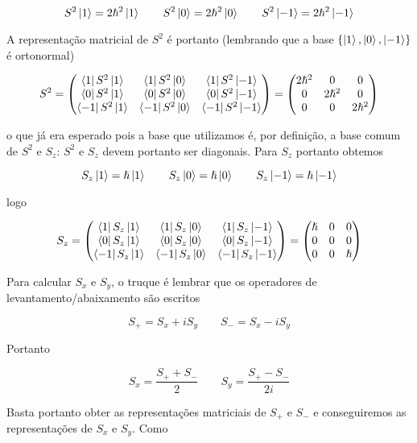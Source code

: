 \documentclass[a4paper, 12pt, notitlepage]{article}
\begin{document}
\begin{enumerate}
\[
S^2 \ket{1} = 2 \hslash^2 \ket{1} \qquad S^2 \ket{0} = 2\hslash^2 \ket{0} \qquad S^2 \ket{-1} = 2\hslash^2 \ket{-1}
\]

A representação matricial de $S^2$ é portanto (lembrando que a base $\{\ket{1}, \ket{0}, \ket{-1}\}$ é ortonormal)

\[
S^2 = \begin{pmatrix} 
  \bra{1} S^2 \ket{1} & \bra{1} S^2 \ket{0} & \bra{1} S^2 \ket{-1} \\
  \bra{0} S^2 \ket{1} & \bra{0} S^2 \ket{0} & \bra{0} S^2 \ket{-1} \\
  \bra{-1} S^2 \ket{1} & \bra{-1} S^2 \ket{0} & \bra{-1} S^2 \ket{-1}
\end{pmatrix}
=
\begin{pmatrix}
  2 \hslash^2 & 0 & 0 \\
  0 & 2\hslash^2 & 0 \\
  0 & 0 & 2\hslash^2
\end{pmatrix}
\]

\noindent o que já era esperado pois a base que utilizamos é, por definição, a base comum de $S^2$ e $S_z$: $S^2$ e $S_z$ devem portanto ser diagonais. Para $S_z$ portanto obtemos

\[ 
S_z\ket{1} = \hslash \ket{1} \qquad S_z \ket{0} = \hslash \ket{0} \qquad S_z \ket{-1} = \hslash \ket{-1} 
\]

\noindent logo

\[
S_z = \begin{pmatrix}
  \bra{1} S_z \ket{1} & \bra{1} S_z \ket{0} & \bra{1} S_z \ket{-1} \\
  \bra{0} S_z \ket{1} & \bra{0} S_z \ket{0} & \bra{0} S_z \ket{-1} \\
  \bra{-1} S_z \ket{1} & \bra{-1} S_z \ket{0} & \bra{-1} S_z \ket{-1}
\end{pmatrix}
= 
\begin{pmatrix}
  \hslash & 0 & 0 \\
  0 & 0 & 0 \\
  0 & 0 & \hslash
\end{pmatrix}
\]

Para calcular $S_x$ e $S_y$, o truque é lembrar que os operadores de levantamento/abaixamento são escritos

\[ S_+ = S_x + iS_y \qquad S_- = S_x - iS_y \]

Portanto

\[ S_x = \frac{S_+ + S_-}{2} \qquad S_y = \frac{S_+ - S_-}{2i}\]

Basta portanto obter as representações matriciais de $S_+$ e $S_-$ e conseguiremos as representações de $S_x$ e $S_y$. Como


\end{enumerate}
\end{document}
